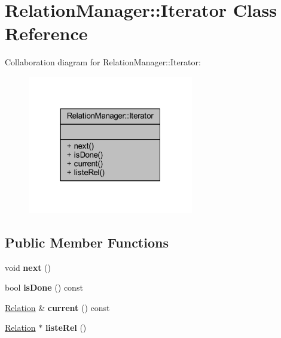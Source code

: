 \hypertarget{class_relation_manager_1_1_iterator}{}\section{Relation\+Manager\+:\+:Iterator Class Reference}
\label{class_relation_manager_1_1_iterator}


Collaboration diagram for Relation\+Manager\+:\+:Iterator\+:\nopagebreak
\begin{figure}[H]
\begin{center}
\leavevmode
\includegraphics[width=205pt]{class_relation_manager_1_1_iterator__coll__graph}
\end{center}
\end{figure}
\subsection*{Public Member Functions}
\begin{DoxyCompactItemize}
\item 
\mbox{\label{class_relation_manager_1_1_iterator_a4deab2fdd2f7b70242ecbfab9d3d1552}} 
void {\bfseries next} ()
\item 
\mbox{\label{class_relation_manager_1_1_iterator_a5e9588417d8c6dc8ce1285612dff7840}} 
bool {\bfseries is\+Done} () const
\item 
\mbox{\label{class_relation_manager_1_1_iterator_ad3f5e514500480f65dc9b14d1aae358f}} 
\hyperlink{class_relation}{Relation} \& {\bfseries current} () const
\item 
\mbox{\label{class_relation_manager_1_1_iterator_a017175bf4f16360c5b2ee5d8fd534d22}} 
\hyperlink{class_relation}{Relation} $\ast$ {\bfseries liste\+Rel} ()
\end{DoxyCompactItemize}
